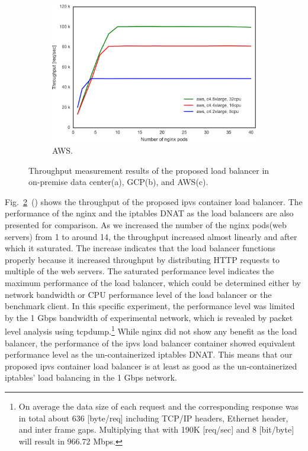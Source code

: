 \begin{figure}[h]
  \begin{subfigure}[t]{\columnwidth}
    \includegraphics[width=0.9\columnwidth]{Figs/aws_c4_ieice}
    \caption{AWS.}
    \label{fig:aws_c4_ieice}
  \end{subfigure}

  \caption{Throughput measurement results of the proposed load balancer in on-premise data center(a), GCP(b), and AWS(c).
}
  \label{fig:ipvs_performance}

\end{figure}


Fig.~\ref{fig:ipvs_performance}~() shows the throughput of the proposed ipvs container load balancer.
The performance of the nginx and the iptables DNAT as the load balancers are also presented for comparison.
As we increased the number of the nginx pods(web servers) from 1 to around 14, the throughput increased almost linearly and after which it saturated.
The increase indicates that the load balancer functions properly because it increased throughput by distributing HTTP requests to multiple of the web servers.
The saturated performance level indicates the maximum performance of the load balancer, which could be determined either by network bandwidth or CPU performance level of the load balancer or the benchmark client.
In this specific experiment, the performance level was limited by the 1 Gbps bandwidth of experimental network\cite{takahashi2018portable}, which is revealed by packet level analysis using tcpdump.\footnote{
On average the data size of each request and the corresponding response was in total about 636 [byte/req] including TCP/IP headers, Ethernet header, and inter frame gaps.
Multiplying that with 190K [req/sec] and 8 [bit/byte] will result in 966.72 Mbps.
}
While nginx did not show any benefit as the load balancer, the performance of the ipvs load balancer container showed equivalent performance level as the un-containerized iptables DNAT.
This means that our proposed ipvs container load balancer is at least as good as the un-containerized iptables' load balancing in the 1 Gbps network.

